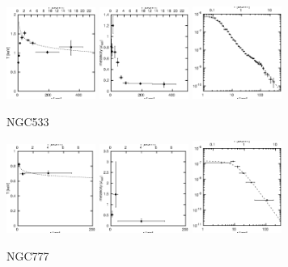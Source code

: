\documentclass[structabstract]{aa}
\begin{document}
\begin{figure}[h]
   \centering
   \includegraphics[width=0.26\textwidth]{tprofile_ngc533.eps}
   \includegraphics[width=0.26\textwidth]{zprofile_ngc533.eps}
   \includegraphics[width=0.26\textwidth]{sbps_ngc533.eps}
   \caption{NGC533}
   \label{fig:tprofngc533}%
\end{figure}
\begin{figure}[h]
   \centering
   \includegraphics[width=0.26\textwidth]{tprofile_ngc777.eps}
   \includegraphics[width=0.26\textwidth]{zprofile_ngc777.eps}
   \includegraphics[width=0.26\textwidth]{sbps_ngc777.eps}
   \caption{NGC777}
   \label{fig:tprofngc777}%
\end{figure}
\end{document}
